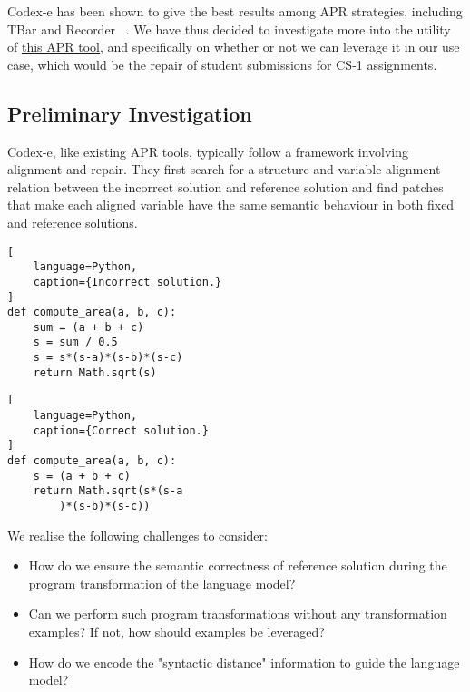 Codex-e has been shown to give the best results among APR strategies, including TBar and Recorder
~\cite{fan2022improving}.
We have thus decided to investigate more into the utility of
\href{https://openai.com/blog/openai-codex/}{this APR tool},
and specifically on whether or not we can leverage it in our use case, which would be the repair
of student submissions for CS-1 assignments.

\subsection{Preliminary Investigation}

Codex-e, like existing APR tools, typically follow a framework involving alignment and repair.
They first search for a structure and variable alignment relation between the incorrect solution
and reference solution and find patches that make each aligned variable have the same semantic
behaviour in both fixed and reference solutions.

\pagebreak

\begin{multicols}{2}
\begin{lstlisting}[
    language=Python,
    caption={Incorrect solution.}
]
def compute_area(a, b, c):
    sum = (a + b + c)
    s = sum / 0.5
    s = s*(s-a)*(s-b)*(s-c)
    return Math.sqrt(s)
\end{lstlisting}

\columnbreak

\begin{lstlisting}[
    language=Python,
    caption={Correct solution.}
]
def compute_area(a, b, c):
    s = (a + b + c)
    return Math.sqrt(s*(s-a
        )*(s-b)*(s-c))
\end{lstlisting}
\end{multicols}

We realise the following challenges to consider:
\begin{itemize}
    \item How do we ensure the semantic correctness of reference solution during the program
          transformation of the language model?
    \item Can we perform such program transformations without any transformation examples?
          If not, how should examples be leveraged?
    \item How do we encode the "syntactic distance" information to guide the language model?
\end{itemize}

